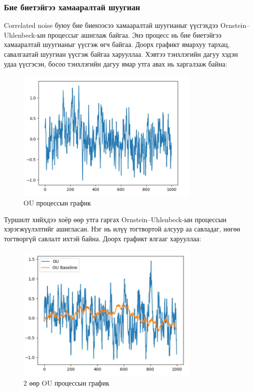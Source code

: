 \documentclass[12pt,A4]{report}
\begin{document}
\subsubsection{Бие биетэйгээ хамааралтай шуугиан}

Correlated noise буюу бие биенээсээ хамааралтай шуугианыг үүсгэхдээ Ornstein–Uhlenbeck-ын процессыг ашиглаж байгаа. Энэ процесс нь бие биетэйгээ хамааралтай шуугианыг үүсгэж өгч байгаа. Доорх графикт ямархуу тархац, савалгаатай шуугиан үүсгэж байгаа харууллаа. Хэвтээ тэнхлэгийн дагуу хэдэн удаа үүсгэсэн, босоо тэнхлэгийн дагуу ямар утга авах нь харгалзаж байна:

\begin{figure}[H]
\centering
\includegraphics[width=0.8\textwidth]{./images/OU_process_graph}
\caption{OU процессын график}
\end{figure}

Туршилт хийхдээ хоёр өөр утга гаргах Ornstein–Uhlenbeck-ын процессын хэрэгжүүлэлтийг ашигласан. Нэг нь илүү тогтвортой алсуур аа савладаг, нөгөө тогтворгүй савлалт ихтэй байна. Доорх графикт ялгааг харууллаа:

\begin{figure}[H]
\centering
\includegraphics[width=0.8\textwidth]{./images/OU_OUBaseline_Graph}
\caption{2 өөр OU процессын график}
\end{figure}
\end{document}
